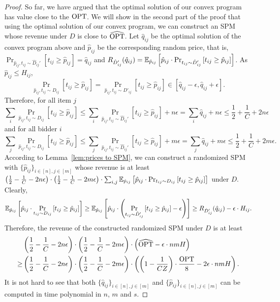 \begin{proof}
So far, we have argued that the optimal solution of our convex program has value close to the $\text{OPT}$. We will show in the second part of the proof that using the optimal solution of our convex program, we can construct an SPM whose revenue under $D$ is close to $\widehat{\text{OPT}}$. Let $\hat{q}_{ij}$ be the optimal solution of the convex program above and $\hat{p}_{ij}$ be the corresponding random price, that is, $\Pr_{\hat{p}_{ij}, t_{ij}\sim \hat{D}_{ij}'}\left[t_{ij}\geq \hat{p}_{ij}\right]=\hat{q}_{ij}$ and $R_{\hat{D}_{ij}'}(\hat{q}_{ij}) = {\mathbb{E}}_{\hat{p}_{ij}}\left[\hat{p}_{ij}\cdot \Pr_{t_{ij}\sim \hat{D}_{ij}'}\left[t_{ij}\geq \hat{p}_{ij}\right]\right]$. As $\hat{p}_{ij}\leq H_{ij}$, $$\Pr_{\hat{p}_{ij}, t_{ij}\sim {D}_{ij}}\left[t_{ij}\geq \hat{p}_{ij}\right]=\Pr_{\hat{p}_{ij}, t_{ij}\sim {D}'_{ij}}\left[t_{ij}\geq \hat{p}_{ij}\right]\in  [\hat{q}_{ij}-\epsilon,\hat{q}_{ij}+\epsilon].$$ Therefore, for all item $j$ $$\sum_{i} \Pr_{\hat{p}_{ij}, t_{ij}\sim {D}_{ij}}\left[t_{ij}\geq \hat{p}_{ij}\right]\leq \sum_{i} \Pr_{\hat{p}_{ij}, t_{ij}\sim \hat{D}_{ij}'}\left[t_{ij}\geq \hat{p}_{ij}\right] + n\epsilon = \sum_i \hat{q}_{ij} +n\epsilon \leq \frac{1}{2} + \frac{1}{C} +2n\epsilon$$ and for all bidder $i$	$$\sum_{j} \Pr_{\hat{p}_{ij}, t_{ij}\sim {D}_{ij}}\left[t_{ij}\geq \hat{p}_{ij}\right]\leq \sum_{j} \Pr_{\hat{p}_{ij}, t_{ij}\sim \hat{D}_{ij}'}\left[t_{ij}\geq \hat{p}_{ij}\right] + m\epsilon = \sum_j \hat{q}_{ij} +m\epsilon \leq \frac{1}{2} + \frac{1}{C} +2m\epsilon.$$ According to Lemma~\ref{lem:prices to SPM}, we can construct a randomized SPM with $\{\hat{p}_{ij}\}_{i\in[n],j\in[m]}$ whose revenue is at least $\left(\frac{1}{2}-\frac{1}{C}-2n\epsilon\right)\cdot\left(\frac{1}{2}-\frac{1}{C}-2m\epsilon\right)\cdot \sum_{i,j} {\mathbb{E}}_{\hat{p}_{ij}}\left[\hat{p}_{ij}\cdot \Pr_{t_{ij}\sim {D}_{ij}}\left[t_{ij}\geq \hat{p}_{ij}\right]\right]$ under $D$. 
Clearly, $${\mathbb{E}}_{\hat{p}_{ij}}\left[\hat{p}_{ij}\cdot \Pr_{t_{ij}\sim {D}_{ij}}\left[t_{ij}\geq \hat{p}_{ij}\right]\right]\geq {\mathbb{E}}_{\hat{p}_{ij}}\left[\hat{p}_{ij}\cdot \left(\Pr_{t_{ij}\sim \hat{D}'_{ij}}\left[t_{ij}\geq \hat{p}_{ij}\right]-\epsilon\right)\right] \geq R_{\hat{D}'_{ij}}(\hat{q}_{ij})-\epsilon\cdot H_{ij}.$$
 Therefore, the revenue of the constructed randomized SPM under $D$ is at least \begin{align*} &\left(\frac{1}{2}-\frac{1}{C}-2n\epsilon\right)\cdot\left(\frac{1}{2}-\frac{1}{C}-2m\epsilon\right)\cdot \left(\widehat{\text{OPT}}-\epsilon\cdot nmH\right)\\
 	\geq & \left(\frac{1}{2}-\frac{1}{C}-2n\epsilon\right)\cdot\left(\frac{1}{2}-\frac{1}{C}-2m\epsilon\right)\cdot \left(\left(1-\frac{1}{ CZ}\right)\cdot \frac{\text{OPT}}{8}-2\epsilon\cdot nmH\right).
 \end{align*}
It is not hard to see that both $\{\hat{q}_{ij}\}_{i\in[n],j\in[m]}$ and $\{\hat{p}_{ij}\}_{i\in[n],j\in[m]}$ can be computed in time polynomial in $n$, $m$ and $s$.
	\end{proof}

